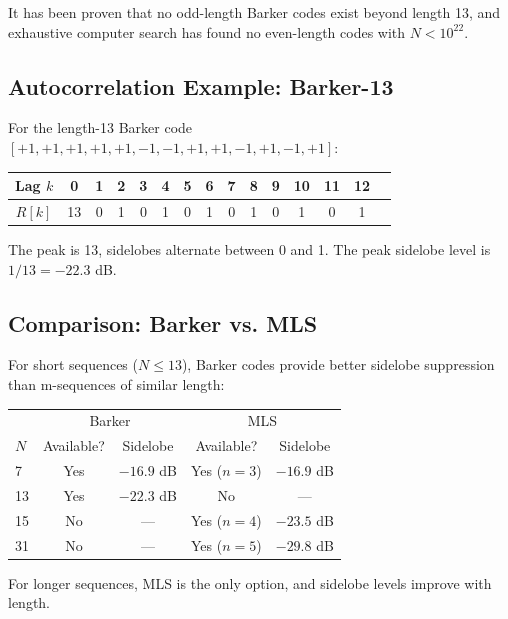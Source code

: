 \documentclass[11pt]{article}
\begin{document}
It has been proven that no odd-length Barker codes exist beyond length 13, and exhaustive computer search has found no even-length codes with $N < 10^{22}$.

\subsection{Autocorrelation Example: Barker-13}

For the length-13 Barker code $[+1, +1, +1, +1, +1, -1, -1, +1, +1, -1, +1, -1, +1]$:

\begin{center}
\begin{tabular}{c|cccccccccccccc}
Lag $k$ & 0 & 1 & 2 & 3 & 4 & 5 & 6 & 7 & 8 & 9 & 10 & 11 & 12 \\
\midrule
$R[k]$ & 13 & 0 & 1 & 0 & 1 & 0 & 1 & 0 & 1 & 0 & 1 & 0 & 1 \\
\end{tabular}
\end{center}

The peak is 13, sidelobes alternate between 0 and 1. The peak sidelobe level is $1/13 = -22.3$ dB.

\subsection{Comparison: Barker vs. MLS}

For short sequences ($N \leq 13$), Barker codes provide better sidelobe suppression than m-sequences of similar length:

\begin{center}
\begin{tabular}{l|cc|cc}
\toprule
& \multicolumn{2}{c|}{Barker} & \multicolumn{2}{c}{MLS} \\
$N$ & Available? & Sidelobe & Available? & Sidelobe \\
\midrule
7 & Yes & $-16.9$ dB & Yes ($n=3$) & $-16.9$ dB \\
13 & Yes & $-22.3$ dB & No & --- \\
15 & No & --- & Yes ($n=4$) & $-23.5$ dB \\
31 & No & --- & Yes ($n=5$) & $-29.8$ dB \\
\bottomrule
\end{tabular}
\end{center}

For longer sequences, MLS is the only option, and sidelobe levels improve with length.

\end{document}
